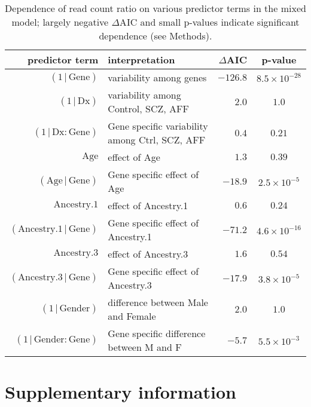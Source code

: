 \documentclass[letterpaper]{article}
\begin{document}
\begin{table}[H]
\begin{center}
\begin{tabular}{rlrc}
predictor term                              & interpretation&   \(\Delta\)AIC &        p-value \\
\hline
\((1\,|\,\mathrm{Gene})\)                   & variability among genes & \(-126.8\)  & \(8.5\times 10^{-28}\) \\
\((1\,|\,\mathrm{Dx})\)                     & variability among Control, SCZ, AFF & \(2.0\)  & \(1.0\)  \\
\((1\,|\,\mathrm{Dx}:\mathrm{Gene})\)       & Gene specific variability among Ctrl, SCZ, AFF & \(0.4\) &  \(0.21\) \\
\(\mathrm{Age}\)                            & effect of Age & \(1.3\)   & \(0.39\) \\
\((\mathrm{Age}\,|\,\mathrm{Gene})\)        & Gene specific effect of Age & \(-18.9\)  & \(2.5\times 10^{-5}\)  \\
\(\mathrm{Ancestry.1}\)                     & effect of Ancestry.1 & \(0.6\)  & \(0.24\) \\
\((\mathrm{Ancestry.1}\,|\,\mathrm{Gene})\) & Gene specific effect of Ancestry.1 & \(-71.2\)   & \(4.6\times 10^{-16}\) \\
\(\mathrm{Ancestry.3}\)                     & effect of Ancestry.3 & \(1.6\)  & \(0.54\) \\
\((\mathrm{Ancestry.3}\,|\,\mathrm{Gene})\) & Gene specific effect of Ancestry.3 & \(-17.9\)   & \(3.8\times 10^{-5}\) \\
\((1\,|\,\mathrm{Gender})\)                 & difference between Male and Female & \(2.0\)  & \(1.0\)  \\
\((1\,|\,\mathrm{Gender}:\mathrm{Gene})\)   & Gene specific difference between M and F & \(-5.7\) &  \(5.5\times 10^{-3}\) \\
\end{tabular}
\end{center}
\caption{Dependence of read count ratio on various predictor terms in the
mixed model; largely
negative \(\Delta\mathrm{AIC}\) and small p-values indicate significant
dependence (see Methods).
}
\label{tab:mod-sel}
\end{table}

\clearpage

\section{Supplementary information}
\end{document}
